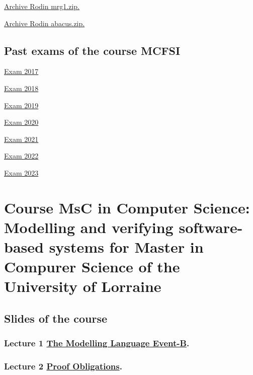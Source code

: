 \documentclass[ 12pt]{article}
\begin{document}
\href{http://mery54.github.io/teaching/mosos/models/mrg1.zip}{Archive 
  Rodin  mrg1.zip.}

\href{http://mery54.github.io/teaching/mosos/models/abacus.zip}{Archive 
  Rodin  abacus.zip.}


\subsection{Past exams  of  the course MCFSI}
\label{sec:past-exams-course}


\href{http://mery54.github.io/teaching/mosos/lecturesnotes/exam2017.pdf}{Exam   2017}


\href{http://mery54.github.io/teaching/mosos/lecturesnotes/exam2018.pdf}{Exam   2018}


\href{http://mery54.github.io/teaching/mosos/lecturesnotes/exam2019.pdf}{Exam   2019}

\href{http://mery54.github.io/teaching/mosos/lecturesnotes/exam2020.pdf}{Exam   2020}

\href{http://mery54.github.io/teaching/mosos/lecturesnotes/exam2021.pdf}{Exam   2021}


\href{http://mery54.github.io/teaching/mosos/lecturesnotes/exam2022.pdf}{Exam   2022}


\href{http://mery54.github.io/teaching/mosos/lecturesnotes/exam2023.pdf}{Exam 
  2023}


\hrulefill

\section{Course  MsC in Computer Science:  Modelling and verifying software-based systems for
  Master in Compurer Science of the University of Lorraine}
\label{sec:course-modell-verify}


\subsection{Slides of the course}
\label{sec:slides-course}

\subsubsection{Lecture 1 
  \href{http://mery54.github.io/teaching/mosos/lecturesnotes/masterillectcm1.pdf}{The 
    Modelling Language Event-B}.}

  
\subsubsection{ Lecture 2 
    \href{http://mery54.github.io/teaching/mosos/lecturesnotes/masterillectcm2.pdf}{Proof 
      Obligations}.}
\end{document}
